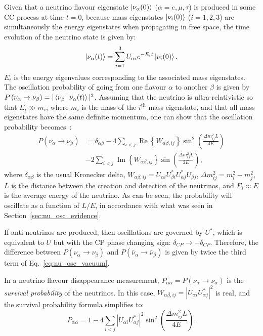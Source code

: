 Given that a neutrino flavour eigenstate $\Ket{\nu_{\alpha}(0)}$ ($\alpha=e,\mu,\tau$) is produced in some CC process at time $t = 0$, because mass eigenstates $\Ket{\nu_{i}(0)}$ ($i=1,2,3$) are simultaneously the energy eigenstates when propagating in free space, the time evolution of the neutrino state is given by:
\begin{equation}
    \Ket{\nu_{\alpha}(t)} = \sum_{i=1}^{3}U_{\alpha i}e^{-E_{i}t}\Ket{\nu_{i}(0)}.
\end{equation}
$E_{i}$ is the energy eigenvalues corresponding to the associated mass eigenstates. The oscillation probability of going from one flavour $\alpha$ to another $\beta$ is given by $P\left(\nu_{\alpha}\to\nu_{\beta}\right) = |\Braket{\nu_{\beta} | \nu_{\alpha}(t)}|^{2}$. Assuming that the neutrino is ultra-relativistic so that $E_{i}\gg m_{i}$, where $m_{i}$ is the mass of the $i^{\mathrm{th}}$ mass eigenstate, and that all mass eigenstates have the same definite momentum, one can show that the oscillation probability becomes~\cite{deppischChapterNeutrinoOscillations2019}: %
\begin{align}\label{eq:nu_osc_vacuum}
    P\left(\nu_{\alpha}\to\nu_{\beta}\right) &=
        \delta_{\alpha\beta} 
        - 4\sum_{i<j}\operatorname{Re}\left\{W_{\alpha\beta,ij}\right\}\sin^{2}\left(\frac{\Delta m^{2}_{ij}L}{4E}\right)\nonumber\\
        &- 2\sum_{i<j}\operatorname{Im}\left\{W_{\alpha\beta,ij}\right\}\sin\left(\frac{\Delta m^{2}_{ij}L}{2E}\right),
\end{align}
where $\delta_{\alpha\beta}$ is the usual Kronecker delta, $W_{\alpha\beta,ij}=U_{\alpha i}U_{\beta i}^{*}U_{\alpha j}^{*}U_{\beta j}$, $\Delta m^{2}_{ij}=m^{2}_{i} - m^{2}_{j}$, $L$ is the distance between the creation and detection of the neutrinos, and $E_{i}\approx E$ is the average energy of the neutrino. As can be seen, the probability will oscillate as a function of $L/E$, in accordance with what was seen in Section~\ref{sec:nu_osc_evidence}.

If anti-neutrinos are produced, then oscillations are governed by $U^{*}$, which is equivalent to $U$ but with the CP phase changing sign: $\delta_{CP}\to -\delta_{CP}$. Therefore, the difference between $P\left(\nu_{\alpha}\to\nu_{\beta}\right)$ and $P\left(\bar{\nu}_{\alpha}\to\bar{\nu}_{\beta}\right)$ is given by twice the third term of Eq.~\ref{eq:nu_osc_vacuum}.

In a neutrino flavour disappearance measurement, $P_{\alpha\alpha} = P\left(\nu_{\alpha}\to\nu_{\alpha}\right)$ is the \textit{survival probability} of the neutrinos. In this case, $W_{\alpha\beta,ij} = |U_{\alpha i}U_{\alpha j}^{*}|^{2}$ is real, and the survival probability formula simplifies to:
\begin{equation}
    P_{\alpha\alpha} = 1 
    - 4\sum_{i<j}|U_{\alpha i}U_{\alpha j}^{*}|^{2}\sin^{2}\left(\frac{\Delta m^{2}_{ij}L}{4E}\right).
\end{equation}

